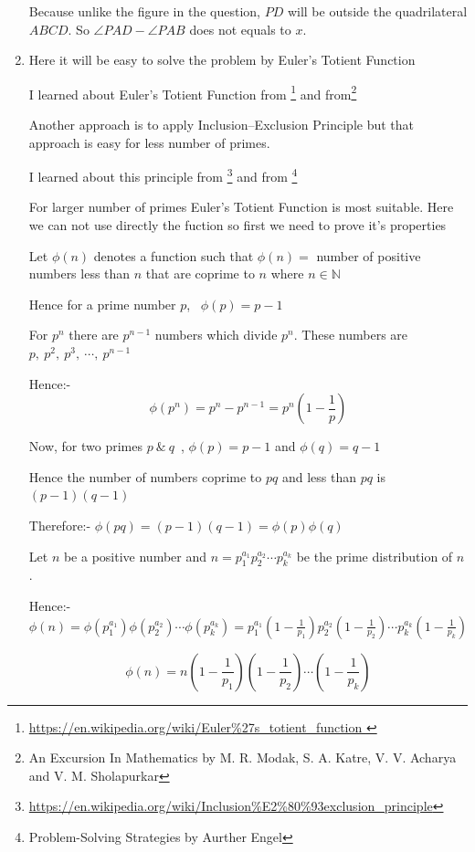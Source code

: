 \documentclass{article}
\begin{document}
\begin{enumerate}
Because unlike the figure in the question, $PD$ will be  outside the quadrilateral $ABCD$. So $\angle PAD-\angle PAB$ does not equals to $x$.
\pagebreak

\item Here it will be easy to solve the problem by Euler's  Totient Function

I learned about Euler's  Totient Function from \footnote{\url{https://en.wikipedia.org/wiki/Euler\%27s_totient_function }}  and from\footnote{An Excursion In Mathematics by M. R. Modak, S. A. Katre, V. V. Acharya and V. M. Sholapurkar}

Another approach is to apply Inclusion–Exclusion Principle but that approach is easy for less number of primes.

I learned about this principle from \footnote{\url{https://en.wikipedia.org/wiki/Inclusion\%E2\%80\%93exclusion_principle}} and from \footnote{Problem-Solving Strategies by Aurther Engel}

For larger number of primes Euler's  Totient Function is most suitable. Here we can not use directly the fuction so first we need to prove it's properties

Let $\phi (n)$ denotes a function such that $\phi (n)=$ number of positive numbers less than $n$ that  are coprime to $n$ where $n\in \mathbb{N}$

Hence for a prime number $p$, \ $\phi (p)=p-1$

For $p^n$ there are $p^{n-1}$ numbers which divide $p^n$. These numbers are $p, \ p^2, \ p^3, \ \cdots , \ p^{n-1}$

Hence:- $$\phi (p^n)=p^n-p^{n-1}=p^n\left (1-\frac{1}{p} \right )$$

Now, for  two primes $p\ \text{\&} \ q$\ , $\phi (p)=p-1$ and $\phi (q)=q-1$

Hence the number of numbers coprime to $pq$ and less than $pq$ is $(p-1)(q-1) $

Therefore:- $\displaystyle{\phi (pq)=(p-1)(q-1)=\phi (p)\phi (q)}$

Let $n$ be a positive number and $n=p_1^{a_1}p_2^{a_2}\cdots p_k^{a_k}$ be the prime distribution of $n$.

Hence:- $\phi (n)=\phi (p_1^{a_1})\phi (p_2^{a_2})\cdots  \phi (p_k^{a_k})=p_1^{a_1}\left (1-\frac{1}{p_1} \right )p_2^{a_2}\left (1-\frac{1}{p_2} \right )\cdots p_k^{a_k}\left (1-\frac{1}{p_k} \right )$

$$\phi (n)=n\left (1-\frac{1}{p_1} \right )\left (1-\frac{1}{p_2} \right )\cdots \left (1-\frac{1}{p_k} \right )$$


\end{enumerate}
\end{document}

